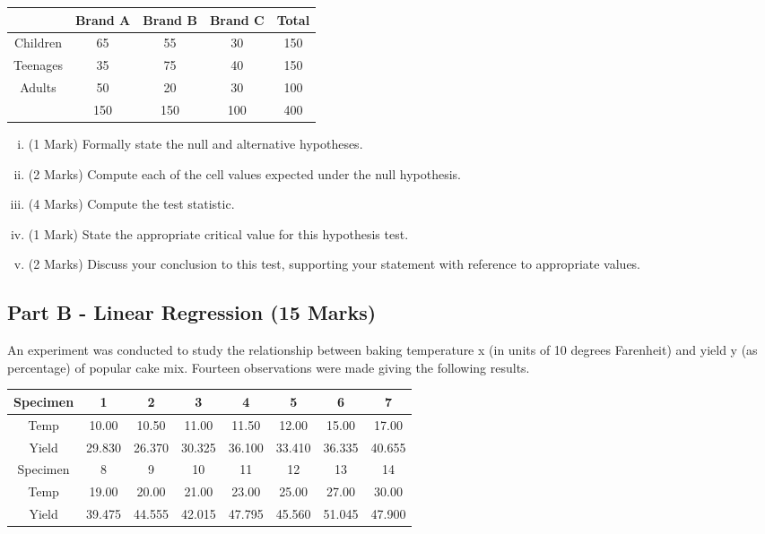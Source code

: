 \documentclass[a4paper,12pt]{article}
\begin{document}
{
	\begin{center}
		\begin{tabular}{|c||c|c|c||c|} \hline
			&	Brand A	&	Brand B	&	Brand C	&	Total	\\ \hline		\hline
			Children	&	65	&	55	&	30	&	150	\\ \hline	
			Teenages	&	35	&	75	&	40	&	150	\\ \hline	
			Adults	&	50	&	20	&	30	&	100	\\ \hline	\hline
			&	150	&	150	&	100	&	400	\\ \hline	 
		\end{tabular} 
	\end{center}
}
\begin{enumerate}[(i)]
	\item (1 Mark) Formally state the null and alternative hypotheses.
	\item (2 Marks) Compute each of the cell values expected under the null hypothesis. 
	\item (4 Marks) Compute the test statistic.
	\item (1 Mark) State the appropriate critical value for this hypothesis test.
	\item (2 Marks) Discuss your conclusion to this test, supporting your statement with reference to appropriate values.
\end{enumerate}




\subsection*{Part B - Linear Regression (15 Marks)}

An experiment was conducted to study the relationship between baking temperature x (in units of 10 degrees Farenheit) and yield y (as percentage) of popular cake mix. Fourteen observations were made giving the following results.





\begin{center}
	\begin{tabular}{|c||c|c|c|c|c|c|c|}
		\hline
		Specimen & 1 & 2 & 3 & 4 & 5 & 6 & 7 \\ \hline
		\hline
		Temp &  10.00 & 10.50 & 11.00 & 11.50 & 12.00 & 15.00 & 17.00 \\ \hline 
		Yield &  29.830&  26.370 & 30.325 &36.100 &33.410 &36.335 & 40.655 \\ \hline 
		\hline\hline
		Specimen & 8 & 9 & 10 & 11 & 12 & 13 & 14 \\  \hline
		Temp &  19.00 & 20.00 & 21.00 & 23.00 & 25.00 & 27.00 & 30.00 \\ \hline
		Yield &  39.475& 44.555&  42.015 & 47.795 & 45.560&  51.045 & 47.900 \\ \hline 
		\hline
	\end{tabular}
\end{center}
\end{document}

